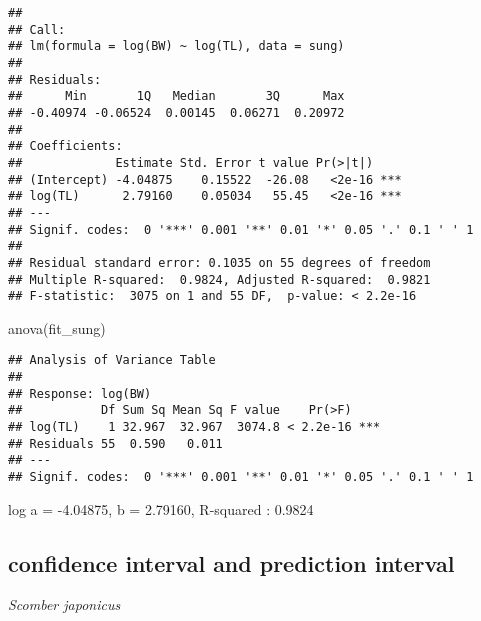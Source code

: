 \documentclass[
]{article}
\newenvironment{Shaded}{\begin{snugshade}}{\end{snugshade}}
\newcommand{\FunctionTok}[1]{\textcolor[rgb]{0.00,0.00,0.00}{#1}}
\newcommand{\NormalTok}[1]{#1}
\begin{document}
\begin{verbatim}
## 
## Call:
## lm(formula = log(BW) ~ log(TL), data = sung)
## 
## Residuals:
##      Min       1Q   Median       3Q      Max 
## -0.40974 -0.06524  0.00145  0.06271  0.20972 
## 
## Coefficients:
##             Estimate Std. Error t value Pr(>|t|)    
## (Intercept) -4.04875    0.15522  -26.08   <2e-16 ***
## log(TL)      2.79160    0.05034   55.45   <2e-16 ***
## ---
## Signif. codes:  0 '***' 0.001 '**' 0.01 '*' 0.05 '.' 0.1 ' ' 1
## 
## Residual standard error: 0.1035 on 55 degrees of freedom
## Multiple R-squared:  0.9824, Adjusted R-squared:  0.9821 
## F-statistic:  3075 on 1 and 55 DF,  p-value: < 2.2e-16
\end{verbatim}

\begin{Shaded}
\begin{Highlighting}[]
\FunctionTok{anova}\NormalTok{(fit\_sung)}
\end{Highlighting}
\end{Shaded}

\begin{verbatim}
## Analysis of Variance Table
## 
## Response: log(BW)
##           Df Sum Sq Mean Sq F value    Pr(>F)    
## log(TL)    1 32.967  32.967  3074.8 < 2.2e-16 ***
## Residuals 55  0.590   0.011                      
## ---
## Signif. codes:  0 '***' 0.001 '**' 0.01 '*' 0.05 '.' 0.1 ' ' 1
\end{verbatim}

log a = -4.04875, b = 2.79160, R-squared : 0.9824

\hypertarget{confidence-interval-and-prediction-interval}{%
\subsection{confidence interval and prediction
interval}\label{confidence-interval-and-prediction-interval}}

\emph{Scomber japonicus}
\end{document}
